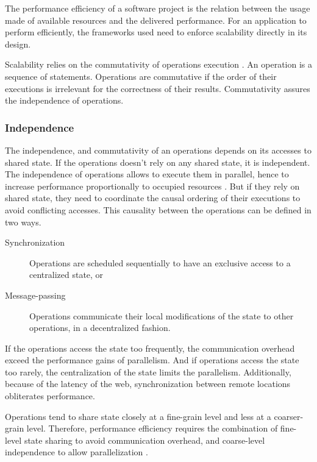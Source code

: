 The performance efficiency of a software project is the relation between the usage made of available resources and the delivered performance.
For an application to perform efficiently, the frameworks used need to enforce scalability directly in its design.

Scalability relies on the commutativity of operations execution \cite{Clements2013a}.
An operation is a sequence of statements.
Operations are commutative if the order of their executions is irrelevant for the correctness of their results.
Commutativity assures the independence of operations.

\subsubsection{Independence}

The independence, and commutativity of an operations depends on its accesses to shared state.
If the operations doesn't rely on any shared state, it is independent.
The independence of operations allows to execute them in parallel, hence to increase performance proportionally to occupied resources \cite{Amdahl1967,Gunther1993}.
But if they rely on shared state, they need to coordinate the causal ordering of their executions to avoid conflicting accesses.
This causality between the operations can be defined in two ways.
\begin{description}
\item[Synchronization] Operations are scheduled sequentially to have an exclusive access to a centralized state, or
\item[Message-passing] Operations communicate their local modifications of the state to other operations, in a decentralized fashion.
\end{description}

If the operations access the state too frequently, the communication overhead exceed the performance gains of parallelism.
And if operations access the state too rarely, the centralization of the state limits the parallelism.
Additionally, because of the latency of the web, synchronization between remote locations obliterates performance.

Operations tend to share state closely at a fine-grain level and less at a coarser-grain level.
Therefore, performance efficiency requires the combination of fine-level state sharing to avoid communication overhead, and coarse-level independence to allow parallelization \cite{Gustafson1988,Gunther1996,Nelson1996,Gunther2002}.

